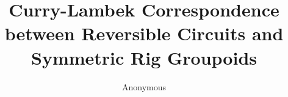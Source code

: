 \documentclass[acmsmall,review,anonymous]{acmart}
\begin{document}


\title{Curry-Lambek Correspondence between Reversible Circuits and Symmetric Rig Groupoids}

\author{Anonymous}

\renewcommand{\shortauthors}{Anonymous}
\end{document}
